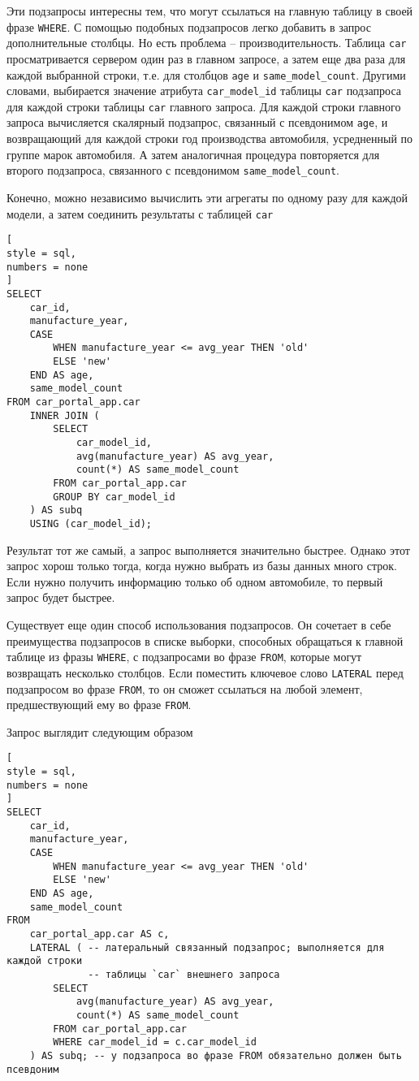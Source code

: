\documentclass[%
	11pt,
	a4paper,
	utf8,
		]{article}
\begin{document}
Эти подзапросы интересны тем, что могут ссылаться на главную таблицу в своей фразе \texttt{WHERE}. С помощью подобных подзапросов легко добавить в запрос дополнительные столбцы. Но есть проблема -- производительность. Таблица \texttt{car} просматривается сервером один раз в главном запросе, а затем еще два раза для каждой выбранной строки, т.е. для столбцов \texttt{age} и \texttt{same\_model\_count}. Другими словами, выбирается значение атрибута \texttt{car\_model\_id} таблицы \texttt{car} подзапроса для каждой строки таблицы \texttt{car} главного запроса. Для каждой строки главного запроса вычисляется скалярный подзапрос, связанный с псевдонимом \texttt{age}, и возвращающий для каждой строки год производства автомобиля, усредненный по группе марок автомобиля. А затем аналогичная процедура повторяется для второго подзапроса, связанного с псевдонимом \texttt{same\_model\_count}.

Конечно, можно независимо вычислить эти агрегаты по одному разу для каждой модели, а затем соединить результаты с таблицей \texttt{car}
\begin{lstlisting}[
style = sql,
numbers = none
]
SELECT
    car_id,
    manufacture_year,
    CASE
        WHEN manufacture_year <= avg_year THEN 'old'
        ELSE 'new'
    END AS age,
    same_model_count
FROM car_portal_app.car
    INNER JOIN (
        SELECT
            car_model_id,
            avg(manufacture_year) AS avg_year,
            count(*) AS same_model_count
        FROM car_portal_app.car
        GROUP BY car_model_id
    ) AS subq
    USING (car_model_id);
\end{lstlisting}

Результат тот же самый, а запрос выполняется значительно быстрее. Однако этот запрос хорош только тогда, когда нужно выбрать из базы данных много строк. Если нужно получить информацию только об одном автомобиле, то первый запрос будет быстрее.

Существует еще один способ использования подзапросов. Он сочетает в себе преимущества подзапросов в списке выборки, способных обращаться к главной таблице из фразы \texttt{WHERE}, с подзапросами во фразе \texttt{FROM}, которые могут возвращать несколько столбцов. Если поместить ключевое слово \texttt{LATERAL} перед подзапросом во фразе \texttt{FROM}, то он сможет ссылаться на любой элемент, предшествующий ему во фразе \texttt{FROM}.

Запрос выглядит следующим образом
\begin{lstlisting}[
style = sql,
numbers = none
]
SELECT
    car_id,
    manufacture_year,
    CASE
        WHEN manufacture_year <= avg_year THEN 'old'
        ELSE 'new'
    END AS age,
    same_model_count
FROM
    car_portal_app.car AS c,
    LATERAL ( -- латеральный связанный подзапрос; выполняется для каждой строки
              -- таблицы `car` внешнего запроса
        SELECT
            avg(manufacture_year) AS avg_year,
            count(*) AS same_model_count
        FROM car_portal_app.car
        WHERE car_model_id = c.car_model_id
    ) AS subq; -- у подзапроса во фразе FROM обязательно должен быть псевдоним
\end{lstlisting}
\end{document}
